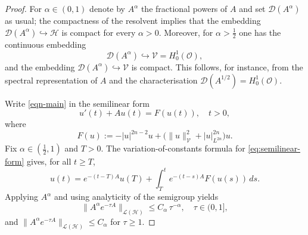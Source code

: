 \documentclass[10pt,a4paper]{amsart}
\numberwithin{equation}{section}
\begin{document}
\begin{proof}
 For $\alpha\in(0,1)$ denote by $A^\alpha$ the fractional
powers of $A$ and set $\mathcal D(A^\alpha)$ as usual; the compactness of the resolvent
implies that the embedding $\mathcal D(A^\alpha)\hookrightarrow \mathcal H$ is
compact for every $\alpha>0$.
Moreover, for $\alpha>\frac12$ one has the continuous embedding
\begin{equation}\label{eq:Dalpha-to-V}
\mathcal D(A^\alpha)\hookrightarrow \mathcal V=H_0^1(\mathcal O),
\end{equation}
and the embedding $\mathcal D(A^\alpha)\hookrightarrow \mathcal V$ is compact.
This follows, for
instance, from the spectral representation of $A$ and the characterisation
$\mathcal D(A^{1/2})=H_0^1(\mathcal O)$.

Write \eqref{eqn-main} in the semilinear form
\begin{equation}\label{eq:semilinear-form}
u'(t)+A u(t)=F(u(t)),\quad t>0,
\end{equation}
where
\[
F(u):= -|u|^{2n-2}u + \bigl(\|u\|_{\mathcal V}^{2}+|u|_{L^{2n}}^{2n}\bigr)u.
\]
Fix $\alpha\in(\tfrac12,1)$ and $T>0$. The variation-of-constants formula for
\eqref{eq:semilinear-form} gives, for all $t\ge T$,
\begin{equation}\label{eq:variation-constants-shift}
u(t)=e^{-(t-T)A}u(T)+\int_T^{t} e^{-(t-s)A}F(u(s))\,ds.
\end{equation}
Applying $A^\alpha$ and using analyticity of the semigroup yields
\begin{equation}\label{eq:smoothing-est}
\|A^\alpha e^{-\tau A}\|_{\mathcal L(\mathcal H)}
\le C_\alpha\,\tau^{-\alpha},\quad \tau\in(0,1],
\end{equation}
and $\|A^\alpha e^{-\tau A}\|_{\mathcal L(\mathcal H)}\le C_\alpha$ for $\tau\ge 1$.


\end{proof}
\end{document}
